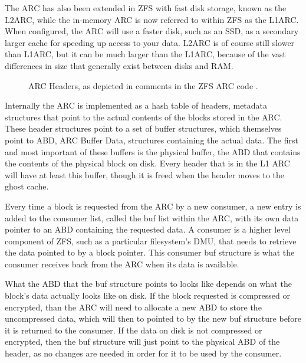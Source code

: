 The ARC has also been extended in ZFS with fast disk storage, known as the L2ARC,
while the in-memory ARC is now referred to within ZFS as the L1ARC.
When configured, the ARC will use a faster disk, such as an SSD, as a secondary larger cache for speeding up access to your data.
L2ARC is of course still slower than L1ARC, but it can be much larger than the L1ARC,
because of the vast differences in size that generally exist between disks and RAM.

\begin{figure}
    \centering
    \resizebox{0.75\linewidth}{!}{}
    \captionsetup{width=0.75\linewidth}
    \caption{ARC Headers, as depicted in comments in the ZFS ARC code \cite[{module/zfs/arc.c}]{zfs}.}
    \label{fig:ARCHeaders}
\end{figure}

Internally the ARC is implemented as a hash table of headers, metadata structures that point to the actual contents of the blocks
stored in the ARC.
These header structures point to a set of buffer structures, which themselves point to ABD, ARC Buffer Data, structures
containing the actual data.
The first and most important of these buffers is the physical buffer, the ABD that contains the contents of the physical block on disk.
Every header that is in the L1 ARC will have at least this buffer, though it is freed when the header moves to the ghost cache.

Every time a block is requested from the ARC by a new consumer, a new entry is added to the consumer list, 
called the buf list within the ARC, with its own data pointer to an ABD containing the requested data.
A consumer is a higher level component of ZFS, such as a particular filesystem's DMU, 
that needs to retrieve the data pointed to by a block pointer.
This consumer buf structure is what the consumer receives back from the ARC when its data is available.

What the ABD that the buf structure points to looks like depends on what the block's data actually looks like on disk.
If the block requested is compressed or encrypted, than the ARC will need to allocate a new ABD to store the uncompressed data,
which will then to pointed to by the new buf structure before it is returned to the consumer.
If the data on disk is not compressed or encrypted, then the buf structure will just point to the physical ABD of the header,
as no changes are needed in order for it to be used by the consumer.

